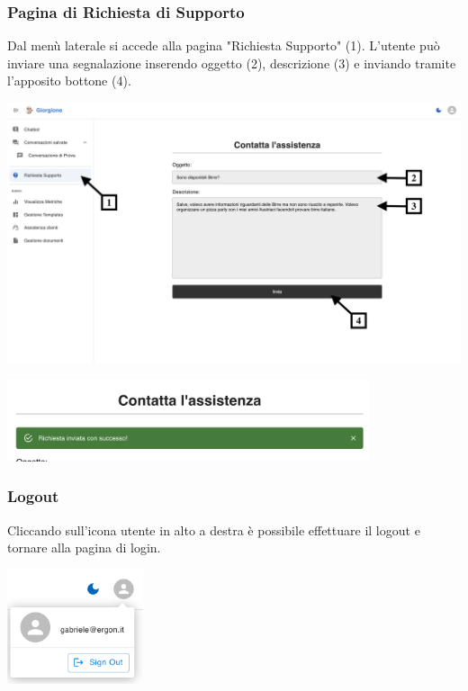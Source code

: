 \subsubsection{Pagina di Richiesta di Supporto}
Dal menù laterale si accede alla pagina "Richiesta Supporto" (1). L’utente può inviare una segnalazione inserendo oggetto (2), descrizione (3) e inviando tramite l’apposito bottone (4).
\begin{center}
    \includegraphics[width=\textwidth]{./img/RichiestaAssistenza1.png}
    \label{fig:Pagina di Assistenza}
\end{center}

\begin{center}
    \includegraphics[width=0.8\textwidth]{./img/RichiestaAssistenza2.png}
    \label{fig:InvioRiuscito}
\end{center}

\subsubsection{Logout}
Cliccando sull’icona utente in alto a destra è possibile effettuare il logout e tornare alla pagina di login.
\begin{center}
    \includegraphics[width=0.3\textwidth]{./img/logout.png}
\end{center}

